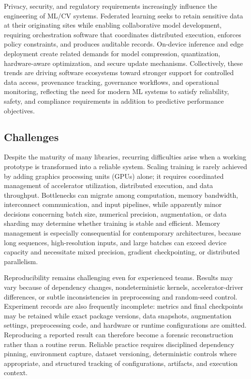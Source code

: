 \documentclass{article}
\newcounter{type}[section]
\begin{document}
Privacy, security, and regulatory requirements increasingly influence the engineering of ML/CV systems. Federated learning seeks to retain sensitive data at their originating sites while enabling collaborative model development, requiring orchestration software that coordinates distributed execution, enforces policy constraints, and produces auditable records. On-device inference and edge deployment create related demands for model compression, quantization, hardware-aware optimization, and secure update mechanisms. Collectively, these trends are driving software ecosystems toward stronger support for controlled data access, provenance tracking, governance workflows, and operational monitoring, reflecting the need for modern ML systems to satisfy reliability, safety, and compliance requirements in addition to predictive performance objectives.


\subsection{Challenges}

Despite the maturity of many libraries, recurring difficulties arise when a working prototype is transformed into a reliable system. Scaling training is rarely achieved by adding graphics processing units (GPUs) alone; it requires coordinated management of accelerator utilization, distributed execution, and data throughput. Bottlenecks can migrate among computation, memory bandwidth, interconnect communication, and input pipelines, while apparently minor decisions concerning batch size, numerical precision, augmentation, or data sharding may determine whether training is stable and efficient. Memory management is especially consequential for contemporary architectures, because long sequences, high-resolution inputs, and large batches can exceed device capacity and necessitate mixed precision, gradient checkpointing, or distributed parallelism.

Reproducibility remains challenging even for experienced teams. Results may vary because of dependency changes, nondeterministic kernels, accelerator-driver differences, or subtle inconsistencies in preprocessing and random-seed control. Experiment records are also frequently incomplete: metrics and final checkpoints may be retained while exact package versions, data snapshots, augmentation settings, preprocessing code, and hardware or runtime configurations are omitted. Reproducing a reported result can therefore become a forensic reconstruction rather than a routine rerun. Reliable practice requires disciplined dependency pinning, environment capture, dataset versioning, deterministic controls where appropriate, and structured tracking of configurations, artifacts, and execution context.
\end{document}
